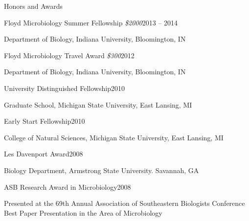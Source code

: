 \documentclass{resume} %
\begin{document}

\begin{rSection}{Honors and Awards}

    \begin{rSubsection}{Floyd Microbiology Summer Fellowship
      {\normalfont \em \$2000}}{2013 -- 2014}{}{}
      \item Department of Biology, Indiana University, Bloomington, IN
    \end{rSubsection}

    \begin{rSubsection}{Floyd Microbiology Travel Award
      {\normalfont \em \$300}}{2012}{}{}
      \item Department of Biology, Indiana University, Bloomington, IN
    \end{rSubsection}

    \begin{rSubsection}{University Distinguished Fellowship}{2010}{}{}
      \item Graduate School, Michigan State University, East Lansing, MI
    \end{rSubsection}

    \begin{rSubsection}{Early Start Fellowship}{2010}{}{}
      \item College of Natural Sciences, Michigan State University, East
      Lansing, MI
    \end{rSubsection}

    \begin{rSubsection}{Les Davenport Award}{2008}{}{}
      \item Biology Department, Armstrong State University. Savannah, GA
    \end{rSubsection}

    \begin{rSubsection}{ASB Research Award in Microbiology}{2008}{}{}
      \item Presented at the 69th Annual Association of Southeastern Biologists
      Conference \\
      Best Paper Presentation in the Area of Microbiology
    \end{rSubsection}


\end{rSection}
\end{document}
